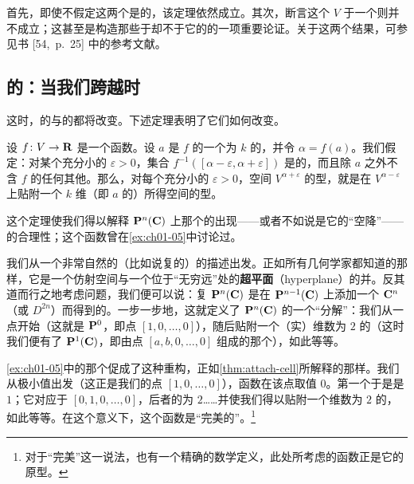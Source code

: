 \begin{remark}\label{thm:reeb-remarks}
首先，即使不假定这两个\trCriticalPoint{}是\trNondegenerate{}的，该定理依然成立。其次，断言这个\trManifold{} $V$ \trDiffeomorphic{}于一个\trSphere{}则并不成立；这甚至是构造那些\trHomeomorphic{}于\trSphere{}却不\trDiffeomorphic{}于它的\trManifold{}的一项重要论证。关于这两个结果，可参见书 [54,~p.~25] 中的参考文献。
\end{remark}

\subsection{\trSublevelSet{}的\trTopology：当我们跨越\trCriticalValue{}时}
\label{subsec:sublevel-sets-crossing}

这时，\trLevelSet{}的\trTopology{}与\trSublevelSet{}的\trTopology{}都将改变。下述定理表明了它们如何改变。

\begin{theorem}\label{thm:attach-cell}
设 $f\colon V\to\mathbf{R}$ 是一个函数。设 $a$ 是 $f$ 的一个\trIndex{}为 $k$ 的\trNondegenerate\trCriticalPoint，并令 $\alpha=f(a)$。我们假定：对某个充分小的 $\varepsilon>0$，集合 $f^{-1}([\alpha-\varepsilon,\alpha+\varepsilon])$ 是\trCompact{}的，而且除 $a$ 之外不含 $f$ 的任何其他\trCriticalPoint。那么，对每个充分小的 $\varepsilon>0$，空间 $V^{\alpha+\varepsilon}$ 的\trHomotopy{}型，就是在 $V^{\alpha-\varepsilon}$ 上贴附一个 $k$ 维\trCellular{}（即 $a$ 的\trUnstableManifold）所得空间的\trHomotopy{}型。
\end{theorem}

\begin{remark}\label{thm:projective-perfect}
这个定理使我们得以解释 $\mathbf{P}^n(\mathbf{C})$ 上那个\trMorseFunction{}的出现——或者不如说是它的“空降”——的合理性；这个函数曾在\cref{ex:ch01-05}中讨论过。

我们从一个非常自然的（比如说复的）\trProjectiveSpace{}的描述出发。正如所有几何学家都知道的那样，它是一个仿射空间与一个位于“无穷远”处的\textbf{超平面}（hyperplane）的并。反其道而行之地考虑问题，我们便可以说：复\trProjectiveSpace{} $\mathbf{P}^n(\mathbf{C})$ 是在 $\mathbf{P}^{n-1}(\mathbf{C})$ 上添加一个 $\mathbf{C}^n$（或\trDisk{} $D^{2n}$）而得到的。一步一步地，这就定义了 $\mathbf{P}^n(\mathbf{C})$ 的一个“\trCellular{}分解”：我们从一点开始（这就是 $\mathbf{P}^0$，即点 $[1,0,\dotsc,0]$），随后贴附一个（实）维数为 $2$ 的\trDisk{}（这时我们便有了 $\mathbf{P}^1(\mathbf{C})$，即由点 $[a,b,0,\dotsc,0]$ 组成的那个\trCellular），如此等等。

\cref{ex:ch01-05}中的那个\trMorseFunction{}促成了这种重构，正如\cref{thm:attach-cell}所解释的那样。我们从极小值出发（这正是我们的点 $[1,0,\dotsc,0]$），函数在该点取值 $0$。第一个\trCriticalValue{}于是是 $1$；它对应于\trCriticalPoint{} $[0,1,0,\dotsc,0]$，后者的\trIndex{}为 $2$……并使我们得以贴附一个维数为 $2$ 的\trCellular，如此等等。在这个意义下，这个函数是“完美的”。\footnote{对于“完美\trMorseFunction”这一说法，也有一个精确的数学定义，此处所考虑的函数正是它的原型。}
\end{remark}

